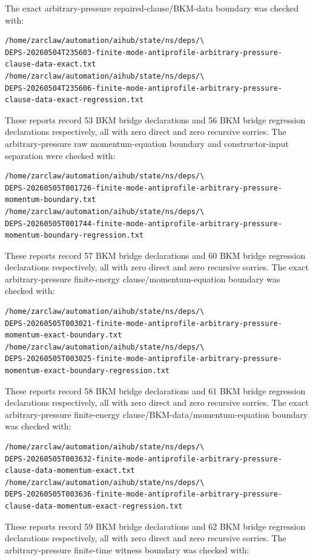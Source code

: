 \documentclass[11pt]{article}
\begin{document}
The exact arbitrary-pressure repaired-clause/BKM-data boundary was checked
with:
\begin{verbatim}
/home/zarclaw/automation/aihub/state/ns/deps/\
DEPS-20260504T235603-finite-mode-antiprofile-arbitrary-pressure-clause-data-exact.txt
/home/zarclaw/automation/aihub/state/ns/deps/\
DEPS-20260504T235606-finite-mode-antiprofile-arbitrary-pressure-clause-data-exact-regression.txt
\end{verbatim}
These reports record 53 BKM bridge declarations and 56 BKM bridge regression
declarations respectively, all with zero direct and zero recursive sorries.
The arbitrary-pressure raw momentum-equation boundary and constructor-input
separation were checked with:
\begin{verbatim}
/home/zarclaw/automation/aihub/state/ns/deps/\
DEPS-20260505T001726-finite-mode-antiprofile-arbitrary-pressure-momentum-boundary.txt
/home/zarclaw/automation/aihub/state/ns/deps/\
DEPS-20260505T001744-finite-mode-antiprofile-arbitrary-pressure-momentum-boundary-regression.txt
\end{verbatim}
These reports record 57 BKM bridge declarations and 60 BKM bridge regression
declarations respectively, all with zero direct and zero recursive sorries.
The exact arbitrary-pressure finite-energy clause/momentum-equation boundary
was checked with:
\begin{verbatim}
/home/zarclaw/automation/aihub/state/ns/deps/\
DEPS-20260505T003021-finite-mode-antiprofile-arbitrary-pressure-momentum-exact-boundary.txt
/home/zarclaw/automation/aihub/state/ns/deps/\
DEPS-20260505T003025-finite-mode-antiprofile-arbitrary-pressure-momentum-exact-boundary-regression.txt
\end{verbatim}
These reports record 58 BKM bridge declarations and 61 BKM bridge regression
declarations respectively, all with zero direct and zero recursive sorries.
The exact arbitrary-pressure finite-energy clause/BKM-data/momentum-equation
boundary was checked with:
\begin{verbatim}
/home/zarclaw/automation/aihub/state/ns/deps/\
DEPS-20260505T003632-finite-mode-antiprofile-arbitrary-pressure-clause-data-momentum-exact.txt
/home/zarclaw/automation/aihub/state/ns/deps/\
DEPS-20260505T003636-finite-mode-antiprofile-arbitrary-pressure-clause-data-momentum-exact-regression.txt
\end{verbatim}
These reports record 59 BKM bridge declarations and 62 BKM bridge regression
declarations respectively, all with zero direct and zero recursive sorries.
The arbitrary-pressure finite-time witness boundary was checked with:
\end{document}
